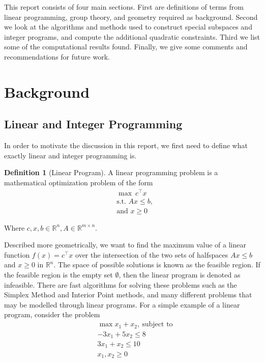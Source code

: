 \documentclass[11pt]{article} %
\theoremstyle{definition}
\newtheorem{definition}[theorem]{Definition}
\theoremstyle{remark}
\newcommand{\RR}{\mathbb{R}}
\begin{document}
This report consists of four main sections. First are definitions of terms from linear programming, group theory, and geometry required as background. Second we look at the algorithms and methods used to construct special subspaces and integer programs, and compute the additional quadratic constraints. Third we list some of the computational results found. Finally, we give some comments and recommendations for future work.

\section{Background}

\subsection{Linear and Integer Programming}

In order to motivate the discussion in this report, we first need to define what exactly linear and integer programming is.

\begin{definition}[Linear Program]
A linear programming problem is a mathematical optimization problem of the form
\begin{align*}
&\max{} \ c^\intercal x \\
&\textrm{s.t. } Ax \leq b, \\
&\textrm{and } x \geq 0
\end{align*}

Where $c, x, b \in \RR^n, A \in \RR^{m \times n}$. 
\end{definition}

 Described more geometrically, we want to find the maximum value of a linear function $f(x) = c^\intercal x$ over the intersection of the two sets of halfspaces $Ax \leq b$ and $x \geq 0$  in $\RR^n$. The space of possible solutions is known as the feasible region. If the feasible region is the empty set $\emptyset$, then the linear program is denoted as infeasible. There are fast algorithms for solving these problems such as the Simplex Method and Interior Point methods, and many different problems that may be modelled through linear programs. 
	For a simple example of a linear program, consider the problem
\begin{align*}
&\max{ x_1 + x_2 }, \ \textrm{subject to} \\
&-3x_1 + 5x_2 \leq 8 \\
&3x_1 + x_2 \leq 10 \\
&x_1, x_2 \geq 0
\end{align*}
\end{document}
